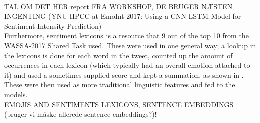 \\
TAL OM DET HER report FRA WORKSHOP, DE BRUGER NÆSTEN INGENTING (YNU-HPCC at EmoInt-2017: Using a CNN-LSTM Model for Sentiment Intensity Prediction)\\
Furthermore, sentiment lexicons is a resource that 9 out of the top 10 from the WASSA-2017 Shared Task used. These were used in one general way; a lookup in the lexicons is done for each word in the tweet, counted up the amount of occurrences in each lexicon (which typically had an overall emotion attached to it) and used a sometimes supplied score and kept a summation, as shown in \cite{seernet}. These were then used as more traditional linguistic features and fed to the models.\\
EMOJIS AND SENTIMENTS LEXICONS, SENTENCE EMBEDDINGS (bruger vi måske allerede sentence embeddings?)!